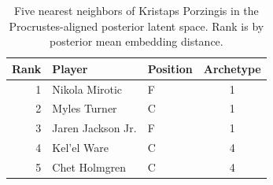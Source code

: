 \begin{table}[htbp]
  \centering\small
  \begin{tabular}{rllc}
    \toprule
    Rank & Player & Position & Archetype \\
    \midrule
    1 & Nikola Mirotic & F & 1 \\
    2 & Myles Turner & C & 1 \\
    3 & Jaren Jackson Jr. & F & 1 \\
    4 & Kel'el Ware & C & 4 \\
    5 & Chet Holmgren & C & 4 \\
    \bottomrule
  \end{tabular}
  \caption{Five nearest neighbors of Kristaps Porzingis in the Procrustes-aligned posterior latent space. Rank is by posterior mean embedding distance.}
  \label{tab:Kristaps_Porzingis_neighbors}
\end{table}

